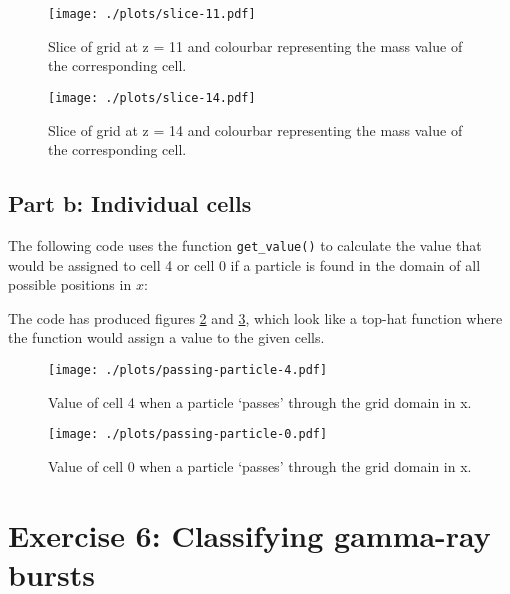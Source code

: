 \documentclass{article}
\begin{document}
\begin{figure}[!h]
\centering
\begin{minipage}[t]{7.8cm}
    \centering
    \texttt{[image: ./plots/slice-11.pdf]}
    \caption{Slice of grid at z = 11 and colourbar representing the mass value of the corresponding cell.}
    \label{fig:slice11}
\end{minipage}
\qquad
\begin{minipage}[t]{7.8cm}
    \centering
    \texttt{[image: ./plots/slice-14.pdf]}
    \caption{Slice of grid at z = 14 and colourbar representing the mass value of the corresponding cell.}
    \label{fig:slice14}
\end{minipage}
\end{figure}

\subsection{Part b: Individual cells}
The following code uses the function \verb+get_value()+ to calculate the value that would be assigned to cell 4 or cell 0 if a particle is found in the domain of all possible positions in $x$:


The code has produced figures \ref{fig:pass4} and \ref{fig:pass0}, which look like a top-hat function where the function would assign a value to the given cells.

\begin{figure}
    \centering
    \texttt{[image: ./plots/passing-particle-4.pdf]}
    \caption{Value of cell 4 when a particle `passes' through the grid domain in x.}
    \label{fig:pass4}
\end{figure}

\begin{figure}
    \centering
    \texttt{[image: ./plots/passing-particle-0.pdf]}
    \caption{Value of cell 0 when a particle `passes' through the grid domain in x.}
    \label{fig:pass0}
\end{figure}

\section{Exercise 6: Classifying gamma-ray bursts}
\end{document}
